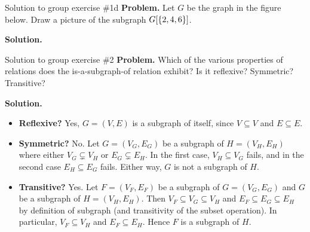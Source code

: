 \documentclass[10pt]{beamer}
\begin{document}
\begin{frame}{Solution to group exercise \#1d}
\small 
\textbf{Problem.} Let $G$ be the graph in the figure below.   Draw a picture of the subgraph $G[\{ {2,4,6} \}]$. 
\vfill 
\begin{center}
\end{center}

\vfill 
\textbf{Solution.} \\[1ex]
\begin{center}
\end{center}
\end{frame}

\begin{frame}{Solution to group exercise \#2}
\textbf{Problem.} Which of the various properties of relations does the is-a-subgraph-of relation exhibit? Is it reflexive? Symmetric? Transitive?
\vfill

\textbf{Solution.}
\begin{itemize}
\item \textbf{Reflexive?} Yes, $G=(V,E)$ is a subgraph of itself, since $V \subseteq V$ and 	$E \subseteq E$.
\item  \textbf{Symmetric?} No. Let $G=(V_G, E_G)$ be a subgraph of $H=(V_H,E_H)$ where either $V_G \subsetneq V_H$ or $E_G \subsetneq E_H$.  In the first case, $V_H \subseteq V_G$ fails, and in the second case  $E_H \subseteq E_G$ fails.  Either way, $G$ is not a subgraph of $H$.
\item \textbf{Transitive?} Yes. Let $F=(V_F, E_F)$ be a subgraph of  $G=(V_G, E_G)$ and  $G$ be a subgraph of  $H=(V_H, E_H)$.   Then $V_F \subseteq V_G \subseteq V_H$ and  $E_F \subseteq E_G \subseteq E_H$  by definition of subgraph (and transitivity of the subset operation).  In particular, $V_F \subseteq V_H$ and  $E_F \subseteq E_H$. Hence $F$ is a subgraph of $H$.
\end{itemize}
	
\end{frame}
\end{document}
